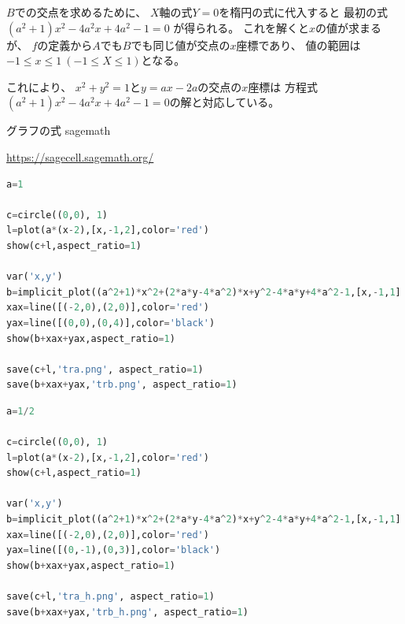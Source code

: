 \documentclass[10pt,b5paper]{ltjsarticle}
\begin{document}
$B$での交点を求めるために、
$X$軸の式$Y=0$を楕円の式に代入すると
最初の式
$(a^2+1)x^2-4a^2x+4a^2-1=0$
が得られる。
これを解くと$x$の値が求まるが、
$f$の定義から$A$でも$B$でも同じ値が交点の$x$座標であり、
値の範囲は$-1\leq x\leq 1 \ (-1\leq X\leq 1)$となる。

これにより、
$x^2+y^2=1$と$y=ax-2a$の交点の$x$座標は
方程式$(a^2+1)x^2-4a^2x+4a^2-1=0$の解と対応している。




\hrulefill

グラフの式 sagemath

\url{https://sagecell.sagemath.org/}

\dotfill

\begin{lstlisting}[language=Python,basicstyle={\scriptsize}]
a=1

c=circle((0,0), 1)
l=plot(a*(x-2),[x,-1,2],color='red')
show(c+l,aspect_ratio=1)

var('x,y')
b=implicit_plot((a^2+1)*x^2+(2*a*y-4*a^2)*x+y^2-4*a*y+4*a^2-1,[x,-1,1],[y,0,4])
xax=line([(-2,0),(2,0)],color='red')
yax=line([(0,0),(0,4)],color='black')
show(b+xax+yax,aspect_ratio=1)

save(c+l,'tra.png', aspect_ratio=1)
save(b+xax+yax,'trb.png', aspect_ratio=1)
\end{lstlisting}

\dotfill

\begin{lstlisting}[language=Python,basicstyle={\scriptsize}]
a=1/2

c=circle((0,0), 1)
l=plot(a*(x-2),[x,-1,2],color='red')
show(c+l,aspect_ratio=1)

var('x,y')
b=implicit_plot((a^2+1)*x^2+(2*a*y-4*a^2)*x+y^2-4*a*y+4*a^2-1,[x,-1,1],[y,-1,3])
xax=line([(-2,0),(2,0)],color='red')
yax=line([(0,-1),(0,3)],color='black')
show(b+xax+yax,aspect_ratio=1)

save(c+l,'tra_h.png', aspect_ratio=1)
save(b+xax+yax,'trb_h.png', aspect_ratio=1)
\end{lstlisting}
\end{document}
